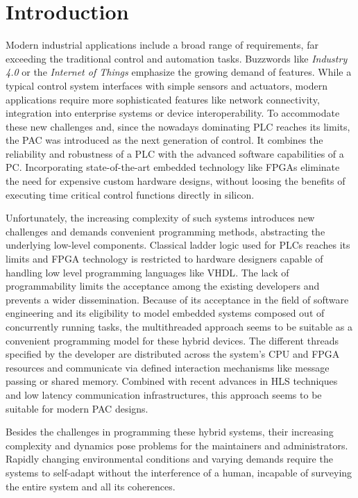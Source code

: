 \chapter{Introduction}

Modern industrial applications include a broad range of requirements, far
exceeding the traditional control and automation tasks. Buzzwords like
\emph{Industry 4.0} or the \emph{Internet of Things} emphasize the growing
demand of features. While a typical control system interfaces with simple
sensors and actuators, modern applications require more sophisticated features
like network connectivity, integration into enterprise systems or device
interoperability. To accommodate these new challenges and, since the nowadays
dominating \ac{PLC} reaches its limits, the \ac{PAC} was introduced as the
next generation of control. It combines the reliability and robustness of a
\ac{PLC} with the advanced software capabilities of a \ac{PC}. Incorporating
state-of-the-art embedded technology like \acp{FPGA} eliminate the need for
expensive custom hardware designs, without loosing the benefits of executing
time critical control functions directly in silicon.

Unfortunately, the increasing complexity of such systems introduces new
challenges and demands convenient programming methods, abstracting the
underlying low-level components. Classical ladder logic used for \acp{PLC}
reaches its limits and \ac{FPGA} technology is restricted to hardware
designers capable of handling low level programming languages like \ac{VHDL}.
The lack of programmability limits the acceptance among the existing
developers and prevents a wider dissemination. Because of its acceptance in
the field of software engineering and its eligibility to model embedded
systems composed out of concurrently running tasks, the multithreaded approach
seems to be suitable as a convenient programming model for these hybrid
devices. The different threads specified by the developer are distributed
across the system's \ac{CPU} and \ac{FPGA} resources and communicate via
defined interaction mechanisms like message passing or shared memory. Combined
with recent advances in \ac{HLS} techniques and low latency communication
infrastructures, this approach seems to be suitable for modern \ac{PAC}
designs.

Besides the challenges in programming these hybrid systems, their increasing
complexity and dynamics pose problems for the maintainers and administrators.
Rapidly changing environmental conditions and varying demands require the
systems to self-adapt without the interference of a human, incapable of
surveying the entire system and all its coherences.

